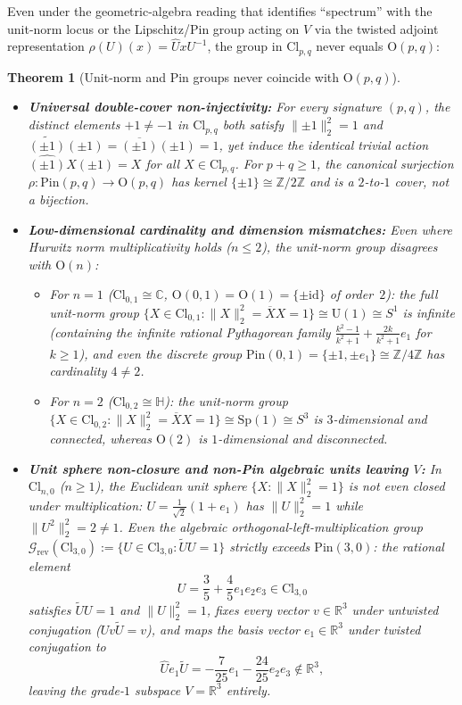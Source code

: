 \documentclass[11pt]{article}
\newtheorem{theorem}{Theorem}[section]
\theoremstyle{definition}
\newcommand{\Cl}{\mathrm{Cl}}
\newcommand{\Pin}{\mathrm{Pin}}
\newcommand{\Orth}{\mathrm{O}}
\newcommand{\R}{\mathbb{R}}
\newcommand{\Z}{\mathbb{Z}}
\newcommand{\C}{\mathbb{C}}
\newcommand{\HH}{\mathbb{H}}
\begin{document}
Even under the geometric-algebra reading that identifies ``spectrum'' with the unit-norm locus or the Lipschitz/Pin group acting on $V$ via the twisted adjoint representation $\rho(U)(x)=\widehat{U}xU^{-1}$, the group in $\Cl_{p,q}$ never equals $\Orth(p,q)$:

\begin{theorem}[Unit-norm and Pin groups never coincide with $\Orth(p,q)$]\label{thm:ref-isom}
\leavevmode
\begin{itemize}
  \item[(a)] \textbf{Universal double-cover non-injectivity:} For every signature $(p,q)$, the distinct elements $+1\ne -1$ in $\Cl_{p,q}$ both satisfy $\|{\pm 1}\|_2^2=1$ and $\widetilde{(\pm 1)}(\pm 1)=\overline{(\pm 1)}(\pm 1)=1$, yet induce the identical trivial action $\widehat{(\pm 1)}X(\pm 1)=X$ for all $X\in\Cl_{p,q}$. For $p+q\ge 1$, the canonical surjection $\rho:\Pin(p,q)\to\Orth(p,q)$ has kernel $\{\pm 1\}\cong\Z/2\Z$ and is a $2$-to-$1$ cover, not a bijection.
  \item[(b)] \textbf{Low-dimensional cardinality and dimension mismatches:} Even where Hurwitz norm multiplicativity holds ($n\le 2$), the unit-norm group disagrees with $\Orth(n)$:
  \begin{itemize}
    \item For $n=1$ ($\Cl_{0,1}\cong\C$, $\Orth(0,1)=\Orth(1)=\{\pm\mathrm{id}\}$ of order~$2$): the full unit-norm group $\{X\in\Cl_{0,1}:\|X\|_2^2=\overline{X}X=1\}\cong\mathrm{U}(1)\cong S^1$ is infinite (containing the infinite rational Pythagorean family $\frac{k^2-1}{k^2+1}+\frac{2k}{k^2+1}e_1$ for $k\ge 1$), and even the discrete group $\Pin(0,1)=\{\pm 1,\pm e_1\}\cong\Z/4\Z$ has cardinality $4\ne 2$.
    \item For $n=2$ ($\Cl_{0,2}\cong\HH$): the unit-norm group $\{X\in\Cl_{0,2}:\|X\|_2^2=\overline{X}X=1\}\cong\mathrm{Sp}(1)\cong S^3$ is $3$-dimensional and connected, whereas $\Orth(2)$ is $1$-dimensional and disconnected.
  \end{itemize}
  \item[(c)] \textbf{Unit sphere non-closure and non-Pin algebraic units leaving $V$:} In $\Cl_{n,0}$ ($n\ge 1$), the Euclidean unit sphere $\{X:\|X\|_2^2=1\}$ is not even closed under multiplication: $U=\frac{1}{\sqrt{2}}(1+e_1)$ has $\|U\|_2^2=1$ while $\|U^2\|_2^2=2\ne 1$. Even the algebraic orthogonal-left-multiplication group $\mathcal{G}_{\mathrm{rev}}(\Cl_{3,0}):=\{U\in\Cl_{3,0}:\widetilde{U}U=1\}$ strictly exceeds $\Pin(3,0)$: the rational element
  \begin{equation}\label{eq:unit30}
    U = \frac{3}{5} + \frac{4}{5}e_1e_2e_3 \in \Cl_{3,0}
  \end{equation}
  satisfies $\widetilde{U}U=1$ and $\|U\|_2^2=1$, fixes every vector $v\in\R^3$ under untwisted conjugation ($Uv\widetilde{U}=v$), and maps the basis vector $e_1\in\R^3$ under twisted conjugation to
  \begin{equation}\label{eq:twisted30}
    \widehat{U}e_1\widetilde{U} = -\frac{7}{25}e_1 - \frac{24}{25}e_2e_3 \notin \R^3,
  \end{equation}
  leaving the grade-$1$ subspace $V=\R^3$ entirely.
\end{itemize}
\end{theorem}
\end{document}
